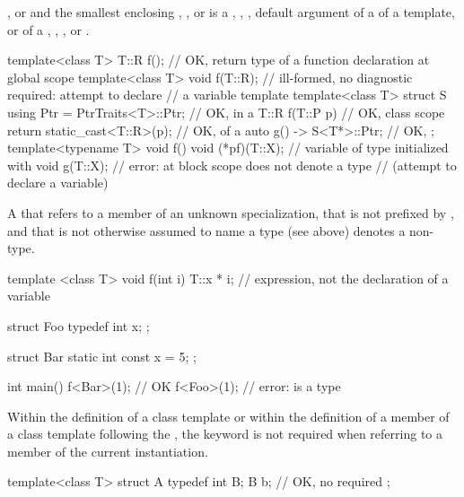 , or
and the smallest enclosing
,
, or
is a
,
,
,
default argument of a  of a template, or
 of a
,
,
, or
.
\begin{example}
\begin{codeblock}
template<class T> T::R f();             // OK, return type of a function declaration at global scope
template<class T> void f(T::R);         // ill-formed, no diagnostic required: attempt to declare
                                        // a  variable template
template<class T> struct S {
  using Ptr = PtrTraits<T>::Ptr;        // OK, in a 
  T::R f(T::P p) {                      // OK, class scope
    return static_cast<T::R>(p);        // OK,  of a 
  }
  auto g() -> S<T*>::Ptr;               // OK, 
};
template<typename T> void f() {
  void (*pf)(T::X);                     // variable  of type  initialized with 
  void g(T::X);                         // error:  at block scope does not denote a type
                                        // (attempt to declare a  variable)
}
\end{codeblock}
\end{example}

\pnum
A  that refers to a member of an unknown specialization,
that is not prefixed by ,
and that is not otherwise assumed to name a type (see above)
denotes a non-type.
\begin{example}
\begin{codeblock}
template <class T> void f(int i) {
  T::x * i;         // expression, not the declaration of a variable 
}

struct Foo {
  typedef int x;
};

struct Bar {
  static int const x = 5;
};

int main() {
  f<Bar>(1);        // OK
  f<Foo>(1);        // error:  is a type
}
\end{codeblock}
\end{example}

\pnum
Within the definition of a class template or within the definition of a
member of a class template following the , the keyword
is not required when referring to
a member of the current instantiation.
\begin{example}
\begin{codeblock}
template<class T> struct A {
  typedef int B;
  B b;              // OK, no  required
};
\end{codeblock}
\end{example}

